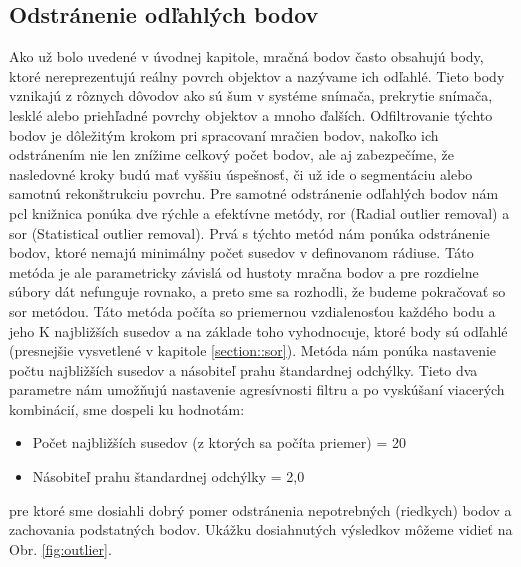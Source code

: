 \subsection{Odstránenie odľahlých bodov}
\noindent Ako už bolo uvedené v úvodnej kapitole, mračná bodov často obsahujú body, ktoré nereprezentujú reálny povrch objektov a nazývame ich odľahlé. Tieto body vznikajú z rôznych dôvodov ako sú šum v systéme snímača, prekrytie snímača, lesklé alebo priehľadné povrchy objektov a mnoho ďalších. Odfiltrovanie týchto bodov je dôležitým krokom pri spracovaní mračien bodov, nakoľko ich odstránením nie len znížime celkový počet bodov, ale aj zabezpečíme, že nasledovné kroky budú mať vyššiu úspešnosť, či už ide o segmentáciu alebo samotnú rekonštrukciu povrchu. 
\newline\indent Pre samotné odstránenie odľahlých bodov nám \acrshort{pcl} knižnica ponúka dve rýchle a efektívne metódy, \acrshort{ror} (Radial outlier removal) a \acrshort{sor} (Statistical outlier removal). Prvá s týchto metód nám ponúka odstránenie bodov, ktoré nemajú minimálny počet susedov v definovanom rádiuse. Táto metóda je ale parametricky závislá od hustoty mračna bodov a pre rozdielne súbory dát nefunguje rovnako, a preto sme sa rozhodli, že budeme pokračovať so \acrshort{sor} metódou. Táto metóda počíta so priemernou vzdialenosťou každého bodu a jeho K najbližších susedov a na základe toho vyhodnocuje, ktoré body sú odľahlé (presnejšie vysvetlené v kapitole \ref{section::sor}). 
\newline\indent Metóda nám ponúka nastavenie počtu najbližších susedov a násobiteľ prahu štandardnej odchýlky. Tieto dva parametre nám umožňujú nastavenie agresívnosti filtru a po vyskúšaní viacerých kombinácií, sme dospeli ku hodnotám:
\begin{itemize}
    \setlength\itemsep{0.2em}
    \item Počet najbližších susedov (z ktorých sa počíta priemer) = 20
    \item Násobiteľ prahu štandardnej odchýlky = 2,0
\end{itemize}
pre ktoré sme dosiahli dobrý pomer odstránenia nepotrebných (riedkych) bodov a zachovania podstatných bodov. Ukážku dosiahnutých výsledkov môžeme vidieť na Obr. \ref{fig:outlier}.

